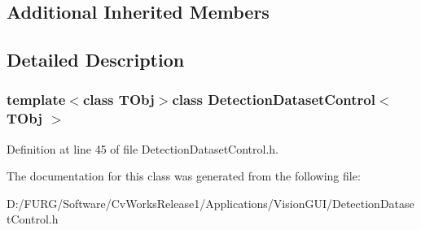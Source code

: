 \subsection*{Additional Inherited Members}


\subsection{Detailed Description}
\subsubsection*{template$<$class T\+Obj$>$class Detection\+Dataset\+Control$<$ T\+Obj $>$}



Definition at line 45 of file Detection\+Dataset\+Control.\+h.



The documentation for this class was generated from the following file\+:\begin{DoxyCompactItemize}
\item 
D\+:/\+F\+U\+R\+G/\+Software/\+Cv\+Works\+Release1/\+Applications/\+Vision\+G\+U\+I/Detection\+Dataset\+Control.\+h\end{DoxyCompactItemize}
